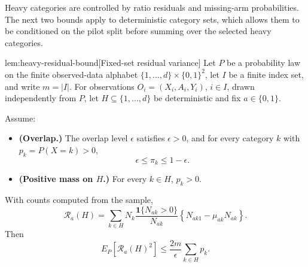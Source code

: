 \documentclass[11pt]{article}
\begin{document}
Heavy categories are controlled by ratio residuals and missing-arm probabilities. The next two bounds apply to deterministic category sets, which allows them to be conditioned on the pilot split before summing over the selected heavy categories.

\begin{lemmav}{lem:heavy-residual-bound}[Fixed-set residual variance]
Let \(P\) be a probability law on the finite observed-data alphabet
\(\{1,\ldots,d\}\times\{0,1\}^2\), let \(I\) be a finite index set, and write
\(m=|I|\).  For observations \(O_i=(X_i,A_i,Y_i)\), \(i\in I\), drawn independently
from \(P\), let \(H\subseteq\{1,\ldots,d\}\) be deterministic and fix
\(a\in\{0,1\}\).

Assume:
\begin{itemize}
\item \textbf{(Overlap.)} The overlap level \(\epsilon\) satisfies \(\epsilon>0\), and for every category \(k\) with \(p_k=P(X=k)>0\),
\[
\epsilon\le \pi_k\le 1-\epsilon .
\]
\item \textbf{(Positive mass on \(H\).)} For every \(k\in H\), \(p_k>0\).
\end{itemize}

With counts computed from the sample,
\[
\mathcal R_a(H)
=
\sum_{k\in H}
N_k\frac{\mathbf 1\{N_{ak}>0\}}{N_{ak}}
\left\{N_{ak1}-\mu_{ak}N_{ak}\right\}.
\]
Then
\[
E_P\!\left[\mathcal R_a(H)^2\right]
\le
\frac{2m}{\epsilon}\sum_{k\in H}p_k .
\]
\end{lemmav}
\end{document}
